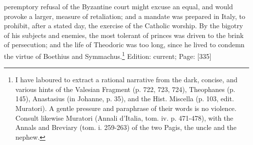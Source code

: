 peremptory refusal of the Byzantine court might excuse an equal, and would provoke a larger, measure of retaliation; and a mandate was prepared in Italy, to prohibit, after a stated day, the exercise of the Catholic worship. By the bigotry of his subjects and enemies, the most tolerant of princes was driven to the brink of persecution; and the life of Theodoric was too long, since he lived to condemn the virtue of Boethius and Symmachus.\footnote{I have laboured to extract a rational narrative from the dark, concise, and various hints of the Valesian Fragment (p. 722, 723, 724), Theophanes (p. 145), Anastasius (in Johanne, p. 35), and the Hist. Miscella (p. 103, edit. Muratori). A gentle pressure and paraphrase of their words is no violence. Consult likewise Muratori (Annali d\texthebrew{}’Italia, tom. iv. p. 471-478), with the Annals and Breviary (tom. i. 259-263) of the two Pagis, the uncle and the nephew.}
Edition: current; Page: [335]

